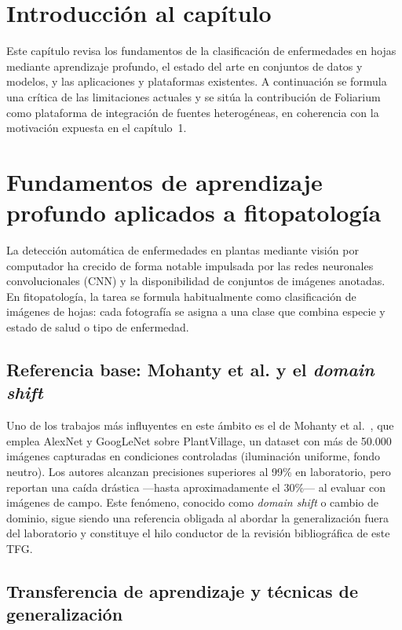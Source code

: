 \documentclass[11pt,spanish,listoffigures,listoftables]{tfgetsinf}
\begin{document}
\section{Introducción al capítulo}

Este capítulo revisa los fundamentos de la clasificación de enfermedades en hojas mediante aprendizaje profundo, el estado del arte en conjuntos de datos y modelos, y las aplicaciones y plataformas existentes. A continuación se formula una crítica de las limitaciones actuales y se sitúa la contribución de Foliarium como plataforma de integración de fuentes heterogéneas, en coherencia con la motivación expuesta en el capítulo~1.

\section{Fundamentos de aprendizaje profundo aplicados a fitopatología}

La detección automática de enfermedades en plantas mediante visión por computador ha crecido de forma notable impulsada por las redes neuronales convolucionales (CNN) y la disponibilidad de conjuntos de imágenes anotadas. En fitopatología, la tarea se formula habitualmente como clasificación de imágenes de hojas: cada fotografía se asigna a una clase que combina especie y estado de salud o tipo de enfermedad.

\subsection{Referencia base: Mohanty et al. y el \textit{domain shift}}

Uno de los trabajos más influyentes en este ámbito es el de Mohanty et al.~\cite{mohanty2016}, que emplea AlexNet y GoogLeNet sobre PlantVillage, un dataset con más de 50.000 imágenes capturadas en condiciones controladas (iluminación uniforme, fondo neutro). Los autores alcanzan precisiones superiores al 99\% en laboratorio, pero reportan una caída drástica ---hasta aproximadamente el 30\%--- al evaluar con imágenes de campo. Este fenómeno, conocido como \textit{domain shift} o cambio de dominio, sigue siendo una referencia obligada al abordar la generalización fuera del laboratorio y constituye el hilo conductor de la revisión bibliográfica de este TFG.

\subsection{Transferencia de aprendizaje y técnicas de generalización}
\end{document}
